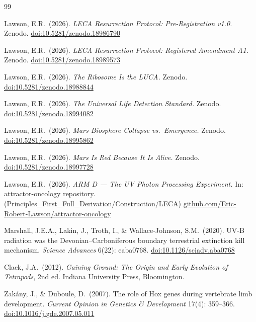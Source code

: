 \documentclass[11pt, a4paper]{article}
\begin{document}
\begin{thebibliography}{99}

Lawson, E.R.\ (2026).
\textit{LECA Resurrection Protocol:
Pre-Registration v1.0.}
Zenodo.
\href{https://doi.org/10.5281/zenodo.18986790}
{doi:10.5281/zenodo.18986790}

Lawson, E.R.\ (2026).
\textit{LECA Resurrection Protocol:
Registered Amendment A1.}
Zenodo.
\href{https://doi.org/10.5281/zenodo.18989573}
{doi:10.5281/zenodo.18989573}

Lawson, E.R.\ (2026).
\textit{The Ribosome Is the LUCA.}
Zenodo.
\href{https://doi.org/10.5281/zenodo.18988844}
{doi:10.5281/zenodo.18988844}

Lawson, E.R.\ (2026).
\textit{The Universal Life Detection Standard.}
Zenodo.
\href{https://doi.org/10.5281/zenodo.18994082}
{doi:10.5281/zenodo.18994082}

Lawson, E.R.\ (2026).
\textit{Mars Biosphere Collapse vs.\ Emergence.}
Zenodo.
\href{https://doi.org/10.5281/zenodo.18995862}
{doi:10.5281/zenodo.18995862}

Lawson, E.R.\ (2026).
\textit{Mars Is Red Because It Is Alive.}
Zenodo.
\href{https://doi.org/10.5281/zenodo.18997728}
{doi:10.5281/zenodo.18997728}

Lawson, E.R.\ (2026).
\textit{ARM D --- The UV Photon Processing
Experiment.}
In: attractor-oncology repository. (Principles\_First\_Full\_Derivation/Construction/LECA)
\href{https://github.com/Eric-Robert-Lawson/attractor-oncology}
{github.com/Eric-Robert-Lawson/attractor-oncology}

Marshall, J.E.A., Lakin, J., Troth, I.,
\& Wallace-Johnson, S.M.\ (2020).
UV-B radiation was the Devonian--Carboniferous
boundary terrestrial extinction kill mechanism.
\textit{Science Advances} 6(22): eaba0768.
\href{https://doi.org/10.1126/sciadv.aba0768}
{doi:10.1126/sciadv.aba0768}

Clack, J.A.\ (2012).
\textit{Gaining Ground: The Origin and Early
Evolution of Tetrapods}, 2nd ed.
Indiana University Press, Bloomington.

Zak\'{a}ny, J., \& Duboule, D.\ (2007).
The role of Hox genes during vertebrate limb
development.
\textit{Current Opinion in Genetics \&
Development} 17(4): 359--366.
\href{https://doi.org/10.1016/j.gde.2007.05.011}
{doi:10.1016/j.gde.2007.05.011}


\end{thebibliography}
\end{document}

